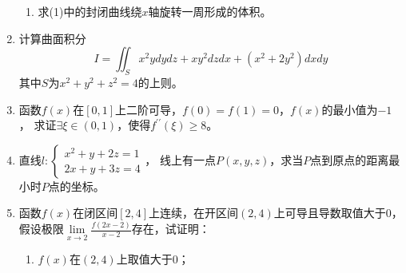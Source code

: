 \begin{enumerate}
\begin{enumerate}
\item 
求(1)中的封闭曲线绕$ x $轴旋转一周形成的体积。

	
	
	
\end{enumerate}




\newpage
\item 
计算曲面积分
\[
I=\iint_S x^2 y d y d z+x y^2 d z d x+\left(x^2+2 y^2\right) d x d y
\]
其中$ S $为$x^2+y^2+z^2=4$的上则。




\item 
函数$f(x)$在$[0,1]$上二阶可导，$f(0)=f(1)=0 $，$  f(x)$的最小值为$ -1 $，
求证$\exists \xi \in(0,1) $，使得$  f^{\prime \prime}(\xi) \geqslant 8$。



\item 
直线$l: \left\{\begin{array}{l}x^2+y+2 z=1 \\ 2 x+y+3 z=4\end{array}\right.$，
线上有一点$P(x, y, z)$，求当$ P $点到原点的距离最小时$ P $点的坐标。








\item 
函数$f(x)$在闭区间$[2,4]$上连续，在开区间$(2,4)$上可导且导数取值大于$ 0 $，假设极限$\lim\limits _{x \rightarrow 2} \frac{f(2 x-2)}{x-2}$存在，试证明：
\begin{enumerate}
	\item
	$f(x)$在$(2,4)$上取值大于$ 0 $；
	

\end{enumerate}
\end{enumerate}
